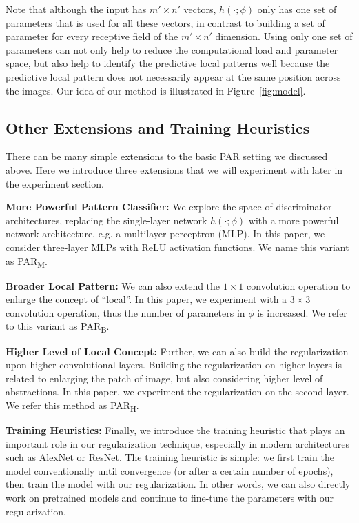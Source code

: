 \documentclass{article}
\begin{document}
Note that although the input has $m' \times n'$ vectors,
$h(\cdot; \phi)$ only has one set of parameters
that is used for all these vectors, 
in contrast to building a set of parameter 
for every receptive field of the $m' \times n'$ dimension. 
Using only one set of parameters can not only help 
to reduce the computational load and parameter space, 
but also help to identify the predictive local patterns well 
because the predictive local pattern does not necessarily appear
at the same position across the images. 
Our idea of our method is illustrated in Figure~\ref{fig:model}. 





\subsection{Other Extensions and Training Heuristics}
There can be many simple extensions to the basic PAR setting we discussed above. 
Here we introduce three extensions that we will experiment with 
later in the experiment section.  

\textbf{More Powerful Pattern Classifier:} 
We explore the space of discriminator architectures,
replacing the single-layer network $h(\cdot; \phi)$ 
with a more powerful network architecture, e.g. a multilayer perceptron (MLP). 
In this paper, we consider three-layer MLPs with ReLU activation functions. 
We name this variant as PAR\textsubscript{M}.

\textbf{Broader Local Pattern:} 
We can also extend the $1 \times 1$ convolution operation 
to enlarge the concept of ``local''. 
In this paper, we experiment with a $3\times 3$ convolution operation, 
thus the number of parameters in $\phi$ is increased. 
We refer to this variant as PAR\textsubscript{B}.

\textbf{Higher Level of Local Concept:} 
Further, we can also build the regularization upon higher convolutional layers. 
Building the regularization on higher layers 
is related to enlarging the patch of image,
but also considering higher level of abstractions. 
In this paper, we experiment the regularization on the second layer.
We refer this method as  PAR\textsubscript{H}. 

\textbf{Training Heuristics:}
Finally, we introduce the training heuristic 
that plays an important role in our regularization technique, 
especially in modern architectures such as AlexNet or ResNet. 
The training heuristic is simple: 
we first train the model conventionally 
until convergence (or after a certain number of epochs), 
then train the model with our regularization. 
In other words, we can also directly work on pretrained models 
and continue to fine-tune the parameters with our regularization.  
\end{document}
